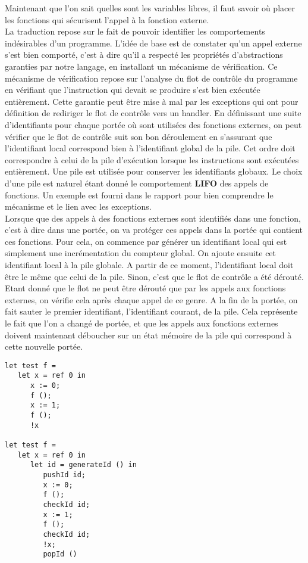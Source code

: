 \documentclass[11pt, a4paper, notitlepage]{article}
\newcommand\tab{{\hspace*{12.5mm}}}
\begin{document}
\tab Maintenant que l'on sait quelles sont les variables libres, il faut savoir où placer les fonctions qui sécurisent l'appel à la fonction externe.\\
\tab La traduction repose sur le fait de pouvoir identifier les comportements indésirables d'un programme. L'idée de base est de constater qu'un appel externe s'est bien comporté, c'est à dire qu'il a respecté les propriétés d'abstractions garanties par notre langage, en installant un mécanisme de vérification. Ce mécanisme de vérification repose sur l'analyse du flot de contrôle du programme en vérifiant que l'instruction qui devait se produire s'est bien exécutée entièrement. Cette garantie peut être mise à mal par les exceptions qui ont pour définition de rediriger le flot de contrôle vers un handler. En définissant une suite d'identifiants pour chaque portée où sont utilisées des fonctions externes, on peut vérifier que le flot de contrôle suit son bon déroulement en s'assurant que l'identifiant local correspond bien à l'identifiant global de la pile. Cet ordre doit correspondre à celui de la pile d'exécution lorsque les instructions sont exécutées entièrement. Une pile est utilisée pour conserver les identifiants globaux. Le choix d'une pile est naturel étant donné le comportement \textbf{LIFO} des appels de fonctions. Un exemple est fourni dans le rapport pour bien comprendre le mécanisme et le lien avec les exceptions.\\
\tab Lorsque que des appels à des fonctions externes sont identifiés dans une fonction, c'est à dire dans une portée, on va protéger ces appels dans la portée qui contient ces fonctions. Pour cela, on commence par générer un identifiant local qui est simplement une incrémentation du compteur global. On ajoute ensuite cet identifiant local à la pile globale. A partir de ce moment, l'identifiant local doit être le même que celui de la pile. Sinon, c'est que le flot de contrôle a été dérouté. Etant donné que le flot ne peut être dérouté que par les appels aux fonctions externes, on vérifie cela après chaque appel de ce genre. A la fin de la portée, on fait sauter le premier identifiant, l'identifiant courant, de la pile. Cela représente le fait que l'on a changé de portée, et que les appels aux fonctions externes doivent maintenant déboucher sur un état mémoire de la pile qui correspond à cette nouvelle portée.

\begin{lstlisting}[language=caml]
let test f =
   let x = ref 0 in
      x := 0;
      f ();
      x := 1;
      f ();
      !x

let test f =
   let x = ref 0 in
      let id = generateId () in
         pushId id;
         x := 0;
         f ();
         checkId id;
         x := 1;
         f ();
         checkId id;
         !x;
         popId ()
\end{lstlisting}
\end{document}
